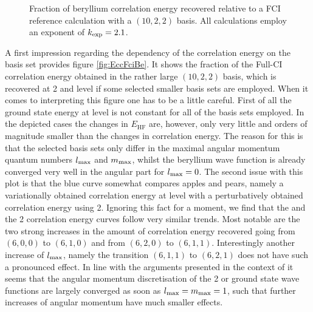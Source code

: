 \begin{figure}
	\centering
	\caption[
		Fraction of beryllium correlation energy
		recovered with selected \CS bases
	]{
		Fraction of beryllium correlation energy recovered
		relative to a FCI reference calculation with a $(10, 2, 2)$ \CS basis.
		All calculations employ an exponent of $k_\text{exp} = 2.1$.
	}
	\label{fig:EccFciBe}
\end{figure}
A first impression regarding the dependency of the correlation energy
on the \CS basis set provides figure \vref{fig:EccFciBe}.
It shows the fraction of the Full-CI correlation energy
obtained in the rather large $(10,2,2)$ basis,
which is recovered at {\MP}2 and \FCI level if
some selected smaller \CS basis sets are employed.
When it comes to interpreting this figure one has to be a little careful.
First of all the ground state energy at \HF level is
not constant for all of the basis sets employed.
In the depicted cases the changes in $E_\text{HF}$ are,
however, only very little and orders of magnitude
smaller than the changes in correlation energy.
The reason for this is that the selected basis sets only differ
in the maximal angular momentum quantum numbers $l_\text{max}$ and $m_\text{max}$,
whilst the beryllium \HF wave function is already
converged very well in the angular part for $l_\text{max} = 0$.
The second issue with this plot
is that the blue curve somewhat compares apples and pears,
namely a variationally obtained correlation energy at \FCI level
with a perturbatively obtained correlation energy using {\MP}2.
Ignoring this fact for a moment,
we find that the \FCI and the {\MP}2 correlation energy curves
follow very similar trends.
Most notable are the two strong increases in the amount of correlation
energy recovered going from $(6,0,0)$ to $(6,1,0)$
and from $(6,2,0)$ to $(6,1,1)$.
Interestingly another increase of $l_\text{max}$,
namely the transition $(6,1,1)$ to $(6,2,1)$
does not have such a pronounced effect.
In line with the arguments presented in the context of \HF
it seems that the angular momentum discretisation
of the {\MP}2 or \FCI ground state wave functions
are largely converged as soon as $l_\text{max} = m_\text{max} = 1$,
such that further increases of angular momentum have much smaller effects.

